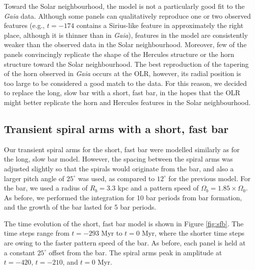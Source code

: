 \documentclass[10pt]{article}
\begin{document}
Toward the Solar neighbourhood, the model is not a particularly good fit to the \textit{Gaia} data. Although some panels can qualitatively reproduce one or two observed features (e.g., $t=-174$ contains a Sirius-like feature in approximately the right place, although it is thinner than in \textit{Gaia}), features in the model are consistently weaker than the observed data in the Solar neighbourhood. Moreover, few of the panels convincingly replicate the shape of the Hercules structure or the horn structure toward the Solar neighbourhood. The best reproduction of the tapering of the horn observed in \textit{Gaia} occurs at the OLR, however, its radial position is too large to be considered a good match to the data. For this reason, we decided to replace the long, slow bar with a short, fast bar, in the hopes that the OLR might better replicate the horn and Hercules features in the Solar neighbourhood.

\subsection{Transient spiral arms with a short, fast bar}
Our transient spiral arms for the short, fast bar were modelled similarly as for the long, slow bar model. However, the spacing between the spiral arms was adjusted slightly so that the spirals would originate from the bar, and also a larger pitch angle of $25^\circ$ was used, as compared to $12^\circ$ for the previous model. For the bar, we used a radius of $R_b = 3.3$ kpc and a pattern speed of $\Omega_b = 1.85 \times \Omega_0$. As before, we performed the integration for 10 bar periods from bar formation, and the growth of the bar lasted for 5 bar periods. 

The time evolution of the short, fast bar model is shown in Figure \ref{fig:sfb}. The time steps range from $t = -293$ Myr to $t = 0$ Myr, where the shorter time steps are owing to the faster pattern speed of the bar. As before, each panel is held at a constant $25^\circ$ offset from the bar. The spiral arms peak in amplitude at $t = -420$, $t = -210$, and $t = 0$ Myr.
\end{document}
